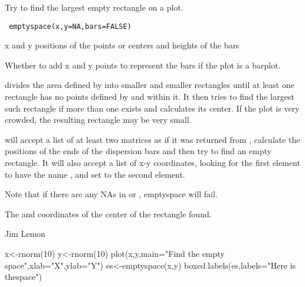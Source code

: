 \begin{Description}\relax
Try to find the largest empty rectangle on a plot.
\end{Description}
\begin{Usage}
\begin{verbatim}
 emptyspace(x,y=NA,bars=FALSE)
\end{verbatim}
\end{Usage}
\begin{Arguments}
\begin{ldescription}
\item[\code{x,y}] x and y positions of the points or centers and heights
of the bars
\item[\code{bars}] Whether to add x and y points to represent the bars if the
plot is a barplot.
\end{ldescription}
\end{Arguments}
\begin{Details}\relax
{} divides the area defined by 
into smaller and smaller rectangles until at least one rectangle has no
points defined by  and  within it. It then tries to find
the largest such rectangle if more than one exists and calculates its
center. If the plot is very crowded, the resulting rectangle may be very
small.

 will accept a list of at least two matrices as if it
was returned from , calculate the positions of the
ends of the dispersion bars and then try to find an empty rectangle.
It will also accept a list of x-y coordinates, looking for the first
element to have the name , and set  to the second element.

Note that if there are any NAs in  or , emptyspace will fail.
\end{Details}
\begin{Value}
The  and  coordinates of the center of the rectangle
found.
\end{Value}
\begin{Author}\relax
Jim Lemon
\end{Author}
\begin{Examples}
\begin{ExampleCode}
 x<-rnorm(10)
 y<-rnorm(10)
 plot(x,y,main="Find the empty space",xlab="X",ylab="Y")
 es<-emptyspace(x,y)
 boxed.labels(es,labels="Here is the\nempty space")
\end{ExampleCode}
\end{Examples}

